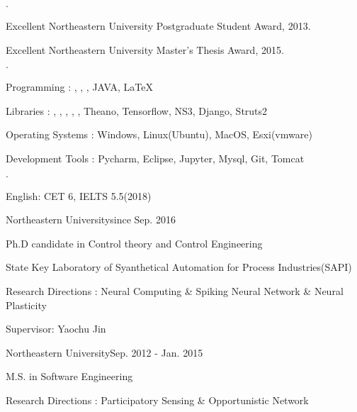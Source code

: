 \documentclass{joel_cv}
\begin{document}
%
%

\begin{sectionItemize}{$\cdot$}
	\item Excellent Northeastern University Postgraduate Student Award, 2013.
    \item Excellent Northeastern University Master's Thesis Award, 2015.
\end{sectionItemize}


%
%

\begin{sectionItemize}{$\cdot$}
	\item Programming : , , , JAVA, \LaTeX
	\item Libraries : , , , , , Theano, Tensorflow, NS3, Django, Struts2
    \item Operating Systems : Windows, Linux(Ubuntu), MacOS, Esxi(vmware)
    \item Development Tools : Pycharm, Eclipse, Jupyter, Mysql, Git, Tomcat
\end{sectionItemize}


%
%

\begin{sectionItemize}{$\cdot$}
	\item English: CET 6, IELTS 5.5(2018)
\end{sectionItemize}


%
%
\newpage
{}
\begin{sectionContentSimple}{Northeastern University}{since Sep. 2016}
	\item Ph.D candidate in Control theory and Control Engineering
	\item State Key Laboratory of Syanthetical Automation for Process Industries(SAPI)
    \item Research Directions : Neural Computing \& Spiking Neural Network \& Neural Plasticity
	\item Supervisor: Yaochu Jin
\end{sectionContentSimple}

\begin{sectionContentSimple}{Northeastern University}{Sep. 2012 - Jan. 2015}
	\item M.S. in Software Engineering
	\item Research Directions : Participatory Sensing \& Opportunistic Network
\end{sectionContentSimple}
\end{document}
